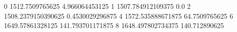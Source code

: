 0 1512.7509765625 4.966064453125
1 1507.784912109375 0.0
2 1508.2379150390625 0.4530029296875
4 1572.535888671875 64.7509765625
6 1649.57861328125 141.793701171875
8 1648.497802734375 140.712890625
